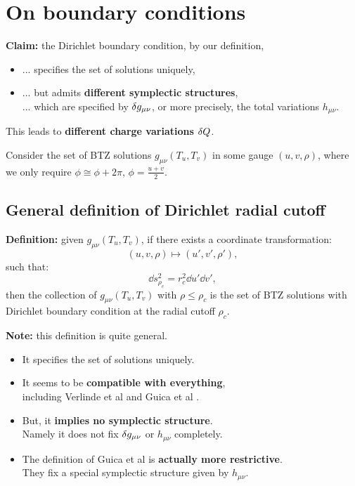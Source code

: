 \documentclass[12pt,a4paper,utf8]{article}
\begin{document}
\setlength{\parskip}{.5\baselineskip}
\setlength{\parindent}{0pt}

\addtocounter{section}{-1}
\section{On boundary conditions}

\textbf{Claim:} the Dirichlet boundary condition, by our definition, 

\begin{itemize}[nosep]
\item ... specifies the set of solutions uniquely,
\item ... but admits \textbf{different symplectic structures}, \\
	... which are specified by $\mathinner{\delta g_{\mu\nu}}$, or more precisely, the total variations $h_{\mu\nu}$. 
\end{itemize}

This leads to \textbf{different charge variations $\mathinner{\delta Q}$}. 

Consider the set of BTZ solutions $g_{\mu\nu}(T_u,T_v)$ in some gauge $(u,v,\rho)$, where we only require $\phi \cong \phi + 2\pi$, $\phi = \frac{u + v}{2}$. 

\subsection{General definition of Dirichlet radial cutoff}

	\textbf{Definition:} given $g_{\mu\nu}(T_u,T_v)$, if there exists a coordinate transformation:
	\begin{equation}
		(u,v,\rho) \mapsto (u',v',\rho'),
	\end{equation}
	such that:
	\begin{equation}
		\dd{s}^2_{\rho_c}
		= r_c^2 \dd{u'} \dd{v'},
	\end{equation}
	then the collection of $g_{\mu\nu}(T_u,T_v)$ with $\rho \le \rho_c$ is the set of BTZ solutions with Dirichlet boundary condition at the radial cutoff $\rho_c$. 
	
	\textbf{Note:} this definition is quite general.
	\begin{itemize}
	\item It specifies the set of solutions uniquely.
	\item It seems to be \textbf{compatible with everything},\\
		including Verlinde et al \cite{McGough:2016lol} and Guica et al \cite{Guica:2019nzm,Kraus:2021cwf}. 
	
	\item But, it \textbf{implies no symplectic structure}. \\
		Namely it does not fix $\mathinner{\delta g_{\mu\nu}}$ or $h_{\mu\nu}$ completely. 
	\item The definition of Guica et al \cite{Guica:2019nzm,Kraus:2021cwf} is \textbf{actually more restrictive}. \\
		They fix a special symplectic structure given by $h_{\mu\nu}$.
	\end{itemize}
\end{document}
